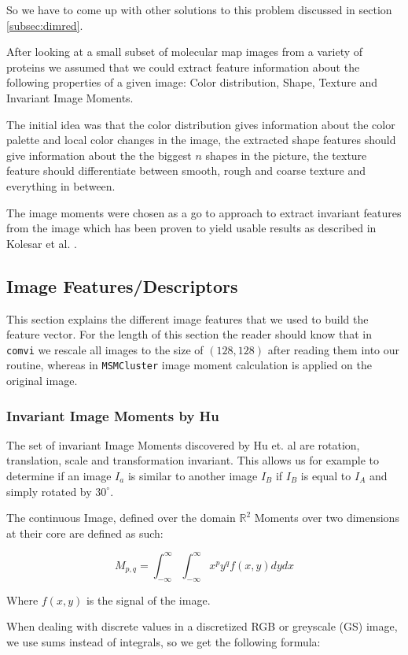 \documentclass[journal]{vgtc}       %
\begin{document}
So we have to come up with other solutions to this problem discussed in section \ref{subsec:dimred}. %

After looking at a small subset of molecular map images from a variety of proteins we assumed that we could  extract feature information about the following properties of a given image: 
Color distribution,   Shape,   Texture  and  Invariant  Image Moments.


The initial idea was that the color distribution gives information about the color palette and local color changes in the image, the extracted shape features should give information about the the biggest \( n \) shapes in the picture, the texture feature should differentiate between smooth, rough and coarse texture and everything in between.

The image moments were chosen as a go to approach to extract invariant features from the image which has been proven to yield usable results as described in Kolesar et al. \cite{kolesar}.

\subsection{Image Features/Descriptors}
This section explains the different image features that we used to build the feature vector.
For the length of this section the reader should know that in \verb|comvi| we rescale  all images to the size of $(128,128)$ after reading them into our routine, whereas in \verb|MSMCluster| image moment calculation is applied on the original image.
\subsubsection{Invariant Image Moments by Hu}\label{subsec:humom}

The set of invariant Image Moments discovered by Hu et. al  are rotation, translation, scale and transformation  invariant. This allows us for example to determine if an image $I_a$ is similar to another image $I_B$ if $I_B$ is equal to $I_A$ and simply rotated by $30^{\circ}$.

The continuous  Image, defined over the domain \(\mathbb{R}^2\) Moments  over two dimensions at their core are defined as such:

\[M_{p,q} = \int^\infty_{- \infty}\int^\infty_{- \infty} x^py^q f(x,y) dy dx \]

Where \(f(x, y)\) is the signal of the image.  

When dealing with discrete values  in a discretized RGB or greyscale (GS) image, we use sums instead of integrals, so we get the following formula:
\end{document}
